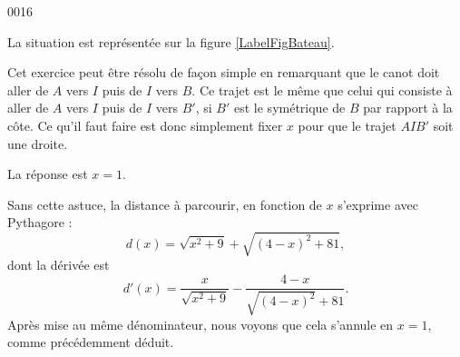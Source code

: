 \begin{corrige}{0016}


La situation est représentée sur la figure \ref{LabelFigBateau}.

Cet exercice peut être résolu de façon simple en remarquant que le canot doit aller de $A$ vers $I$ puis de $I$ vers $B$. Ce trajet est le même que celui qui consiste à aller de $A$ vers $I$ puis de $I$ vers $B'$, si $B'$ est le symétrique de $B$ par rapport à la côte. Ce qu'il faut faire est donc simplement fixer $x$ pour que le trajet $AIB'$ soit une droite.

La réponse est $x=1$.

Sans cette astuce, la distance à parcourir, en fonction de $x$ s'exprime avec Pythagore :
\begin{equation}
	d(x)=\sqrt{x^2+9}+\sqrt{(4-x)^2+81},
\end{equation}
dont la dérivée est
\begin{equation}
	d'(x)=\frac{ x }{ \sqrt{x^2+9} }-\frac{ 4-x }{ \sqrt{(4-x)^2}+81 }.
\end{equation}
Après mise au même dénominateur, nous voyons que cela s'annule en $x=1$, comme précédemment déduit.

\newcommand{\CaptionFigBateau}{Petit dessin pour l'exercice \ref{exo0016}.}


\end{corrige}
